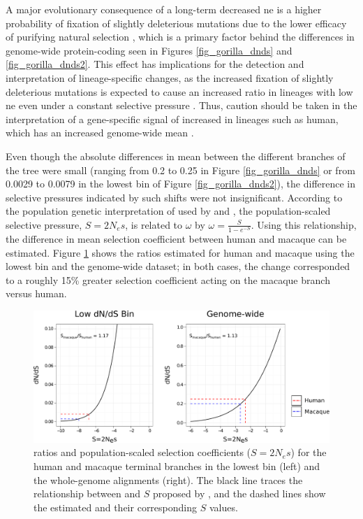 A major evolutionary consequence of a long-term decreased \ac{ne} is a
higher probability of fixation of slightly deleterious mutations due
to the lower efficacy of purifying natural selection \citep{EyreWalker2002},
which is a primary factor behind the differences in genome-wide
protein-coding \dnds seen in Figures \ref{fig_gorilla_dnds} and
\ref{fig_gorilla_dnds2}. This effect has implications for the
detection and interpretation of lineage-specific \dnds changes, as the
increased fixation of slightly deleterious mutations is expected to
cause an increased \dnds ratio in lineages with low \ac{ne} even under
a constant selective pressure \citep{Ellegren2009}. Thus, caution
should be taken in the interpretation of a gene-specific signal of
increased \dnds in lineages such as human, which has an increased
genome-wide mean \dnds.


Even though the absolute
differences in mean \dnds between the different branches of the tree
were small (ranging from 0.2 to 0.25 in Figure \ref{fig_gorilla_dnds}
or from 0.0029 to 0.0079 in the lowest bin of Figure
\ref{fig_gorilla_dnds2}), the difference in selective pressures
indicated by such shifts were not insignificant. According to the
population genetic interpretation of \dnds used by \citet{Kimura1985}
and \citet{Nielsen2003}, the population-scaled selective pressure,
$S=2N_{e}s$, is related to $\omega$ by
$\omega=\frac{S}{1-e^{-S}}$. Using this relationship, the difference
in mean selection coefficient between human and macaque can be
estimated. Figure \ref{fig_s_w} shows the \dnds ratios estimated for
human and macaque using the lowest \dnds bin and the genome-wide
dataset; in both cases, the \dnds change corresponded to a roughly
15\% greater selection coefficient acting on the macaque branch versus
human.

\begin{figure}
\centering
\includegraphics[scale=0.65]{Figs/s_w.pdf}
\caption{\dnds ratios and population-scaled selection coefficients
  ($S=2N_{e}s$) for the human and macaque terminal branches in the
  lowest \dnds bin (left) and the whole-genome alignments (right). The
  black line traces the relationship between \dnds and $S$ proposed by
  \citet{Nielsen2003}, and the dashed lines show the estimated \dnds
  and their corresponding $S$ values.}
\label{fig_s_w}
\end{figure}


